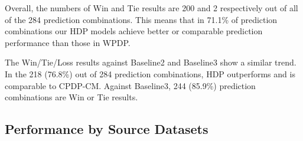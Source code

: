 


Overall, the numbers of Win and
Tie results are 200 and 2 respectively out of all of the 284 prediction
combinations.
This means that in 71.1\% of prediction combinations our HDP
models achieve better or comparable prediction performance than those in
WPDP.

The Win/Tie/Loss results against Baseline2 and Baseline3 show a similar trend.
In the 218 (76.8\%) out of 284 prediction combinations, HDP outperforms and is comparable to CPDP-CM. Against Baseline3, 244
(85.9\%) prediction combinations are Win or Tie results.



\subsection{Performance by Source Datasets}

